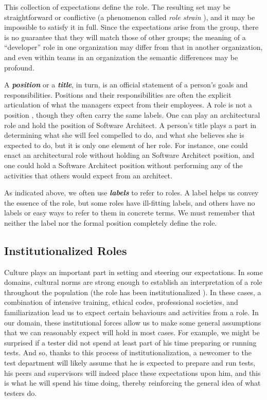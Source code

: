 \documentclass[10pt, conference, compsocconf]{IEEEtran}
\begin{document}
This collection of expectations define the role. The resulting set may be straightforward or conflictive (a phenomenon called \emph{role strain} \cite{Goode1960}), and it may be impossible to satisfy it in full. Since the expectations arise from the group, there is no guarantee that they will match those of other groups; the meaning of a ``developer'' role in one organization may differ from that in another organization, and even within teams in an organization the semantic differences may be profound.

A \textbf{\emph{position}} or a \textbf{\emph{title}}, in turn, is an official statement of a person's goals and responsibilities. Positions and their responsibilities are often the explicit articulation of what the managers expect from their employees. A role is not a position \cite{Turner1956}, though they often carry the same labels. One can play an architectural role and hold the position of Software Architect. A person's title plays a part in determining what she will feel compelled to do, and what she believes she is expected to do, but it is only one element of her role. For instance, one could enact an architectural role without holding an Software Architect position, and one could hold a Software Architect position without performing any of the activities that others would expect from an architect.

As indicated above, we often use \textbf{\emph{labels}} to refer to roles. A label helps us convey the essence of the role, but some roles have ill-fitting labels, and others have no labels or easy ways to refer to them in concrete terms. We must remember that neither the label nor the formal position completely define the role.


\subsection{Institutionalized Roles}

Culture plays an important part in setting and steering our expectations. In some domains, cultural norms are strong enough to establish an interpretation of a role throughout the population (the role has been institutionalized \cite{DiMaggio1991}). In these cases, a combination of intensive training, ethical codes, professional societies, and familiarization lead us to expect certain behaviours and activities from a role. In our domain, these institutional forces allow us to make some general assumptions that we can reasonably expect will hold in most cases. For example, we might be surprised if a tester did not spend at least part of his time preparing or running tests. And so, thanks to this process of institutionalization, a newcomer to the test department will likely assume that he is expected to prepare and run tests, his peers and supervisors will indeed place these expectations upon him, and this is what he will spend his time doing, thereby reinforcing the general idea of what testers do.
\end{document}
